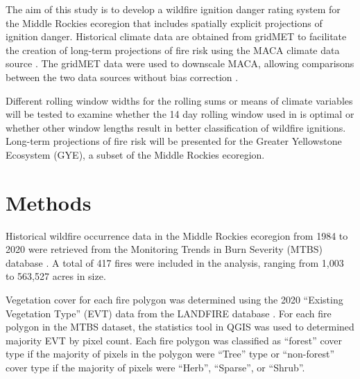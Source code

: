 \documentclass[11pt]{article}
\begin{document}
The aim of this study is to develop a wildfire ignition danger rating system for the Middle Rockies ecoregion that includes spatially explicit projections of ignition danger. Historical climate data are obtained from gridMET to facilitate the creation of long-term projections of fire risk using the MACA climate data source \citep{abatzoglouComparisonStatisticalDownscaling2012}.  The gridMET data were used to downscale MACA, allowing comparisons between the two data sources without bias correction \citep{tercekRobustProjectionsConsequences2023}.

Different rolling window widths for the rolling sums or means of climate variables will be tested to examine whether the 14 day rolling window used in \citet{thomaWaterBalanceIndicator2020} is optimal or whether other window lengths result in better classification of wildfire ignitions.  Long-term projections of fire risk will be presented for the Greater Yellowstone Ecosystem (GYE), a subset of the Middle Rockies ecoregion.  



\section{Methods}

Historical wildfire occurrence data in the Middle Rockies ecoregion \citep{omernikEcoregionsConterminousUnited1987} from 1984 to 2020 were retrieved from the Monitoring Trends in Burn Severity (MTBS) database \citep{eidenshinkProjectMonitoringTrends2007}.  A total of 417 fires were included in the analysis, ranging from 1,003 to 563,527 acres in size.  

Vegetation cover for each fire polygon was determined using the 2020 ``Existing Vegetation Type'' (EVT) data from the LANDFIRE database \citep{rollinsLANDFIRENationallyConsistent2009}.  For each fire polygon in the MTBS dataset, the statistics tool in QGIS was used to determined majority EVT by pixel count.  Each fire polygon was classified as ``forest'' cover type if the majority of pixels in the polygon were ``Tree'' type or ``non-forest'' cover type if the majority of pixels were ``Herb'', ``Sparse'', or ``Shrub''.  
\end{document}
